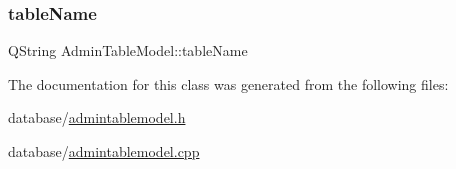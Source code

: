 \mbox{\label{class_admin_table_model_aa0c4f5fa7a71cc6b253af2fd58f9d92c}} 
\subsubsection{\texorpdfstring{tableName}{tableName}}
{\footnotesize\ttfamily Q\+String Admin\+Table\+Model\+::table\+Name\hspace{0.3cm}{\ttfamily [private]}}



The documentation for this class was generated from the following files\+:\begin{DoxyCompactItemize}
\item 
database/\mbox{\hyperlink{admintablemodel_8h}{admintablemodel.\+h}}\item 
database/\mbox{\hyperlink{admintablemodel_8cpp}{admintablemodel.\+cpp}}\end{DoxyCompactItemize}
